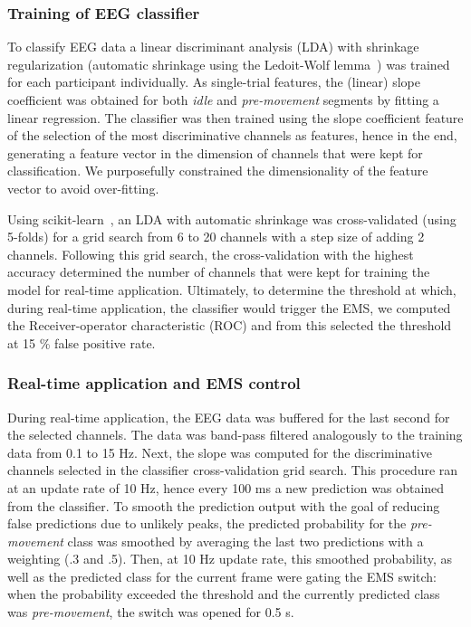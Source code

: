 \subsubsection{Training of EEG classifier}
To classify EEG data a linear discriminant analysis (LDA) with shrinkage regularization (automatic shrinkage using the Ledoit-Wolf lemma~\cite{Ledoit2004-bi}) was trained for each participant individually. As single-trial features, the (linear) slope coefficient was obtained for both \textit{idle} and \textit{pre-movement} segments by fitting a linear regression. The classifier was then trained using the slope coefficient feature of the selection of the most discriminative channels as features, hence in the end, generating a feature vector in the dimension of channels that were kept for classification. We purposefully constrained the dimensionality of the feature vector to avoid over-fitting. 

Using scikit-learn~\cite{Pedregosa2012-sj}, an LDA with automatic shrinkage was cross-validated (using 5-folds) for a grid search from 6 to 20 channels with a step size of adding 2 channels. Following this grid search, the cross-validation with the highest accuracy determined the number of channels that were kept for training the model for real-time application. Ultimately, to determine the threshold at which, during real-time application, the classifier would trigger the EMS, we computed the Receiver-operator characteristic (ROC) and from this selected the threshold at 15 \% false positive rate.

\subsubsection{Real-time application and EMS control}
During real-time application, the EEG data was buffered for the last second for the selected channels. The data was band-pass filtered analogously to the training data from 0.1 to 15 Hz. Next, the slope was computed for the discriminative channels selected in the classifier cross-validation grid search. This procedure ran at an update rate of 10 Hz, hence every 100 ms a new prediction was obtained from the classifier. To smooth the prediction output with the goal of reducing false predictions due to unlikely peaks, the predicted probability for the \textit{pre-movement} class was smoothed by averaging the last two predictions with a weighting (.3 and .5). Then, at 10 Hz update rate, this smoothed probability, as well as the predicted class for the current frame were gating the EMS switch: when the probability exceeded the threshold and the currently predicted class was \textit{pre-movement}, the switch was opened for 0.5 s.

